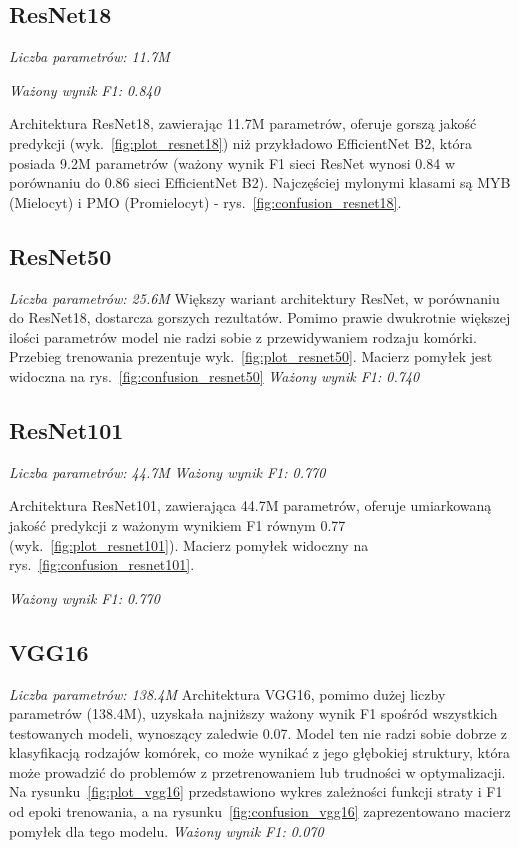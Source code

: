 \subsection{ResNet18}
\textit{Liczba parametrów: 11.7M}

\textit{Ważony wynik F1: 0.840}

Architektura ResNet18, zawierając 11.7M parametrów, oferuje gorszą jakość predykcji (wyk.~\ref{fig:plot_resnet18}) niż przykładowo EfficientNet B2, która posiada 9.2M parametrów (ważony wynik F1 sieci ResNet wynosi 0.84 w porównaniu do 0.86 sieci EfficientNet B2).
Najczęściej mylonymi klasami są MYB (Mielocyt) i PMO (Promielocyt) - rys.~\ref{fig:confusion_resnet18}.

\subsection{ResNet50}
\textit{Liczba parametrów: 25.6M}
Większy wariant architektury ResNet, w porównaniu do ResNet18, dostarcza gorszych rezultatów. Pomimo prawie dwukrotnie większej ilości parametrów model nie radzi sobie z przewidywaniem rodzaju komórki. Przebieg trenowania prezentuje wyk.~\ref{fig:plot_resnet50}. Macierz pomyłek jest widoczna na rys.~\ref{fig:confusion_resnet50}
\textit{Ważony wynik F1: 0.740}

\subsection{ResNet101}
\textit{Liczba parametrów: 44.7M}
\textit{Ważony wynik F1: 0.770}

Architektura ResNet101, zawierająca 44.7M parametrów, oferuje umiarkowaną jakość predykcji z ważonym wynikiem F1 równym 0.77 (wyk.~\ref{fig:plot_resnet101}). Macierz pomyłek widoczny na rys.~\ref{fig:confusion_resnet101}.

\textit{Ważony wynik F1: 0.770}

\subsection{VGG16}
\textit{Liczba parametrów: 138.4M}
Architektura VGG16, pomimo dużej liczby parametrów (138.4M), uzyskała najniższy ważony wynik F1 spośród wszystkich testowanych modeli, wynoszący zaledwie 0.07. Model ten nie radzi sobie dobrze z klasyfikacją rodzajów komórek, co może wynikać z jego głębokiej struktury, która może prowadzić do problemów z przetrenowaniem lub trudności w optymalizacji. Na rysunku~\ref{fig:plot_vgg16} przedstawiono wykres zależności funkcji straty i F1 od epoki trenowania, a na rysunku~\ref{fig:confusion_vgg16} zaprezentowano macierz pomyłek dla tego modelu.
\textit{Ważony wynik F1: 0.070}

